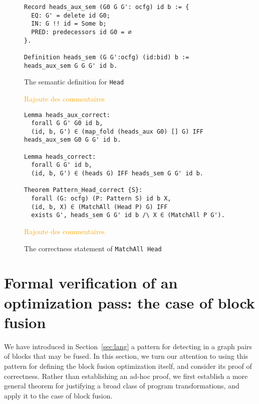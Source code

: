 \documentclass[11pt]{article}
\newcommand{\inlinecoq}[1]{\mbox{\lstinline[style=customcoq,columns=fixed,basewidth=.48em]{#1}}}
\newcommand{\ilc}[1]{\inlinecoq{#1}}
\newcommand{\gr}[1]{\textcolor{Orange}{#1}}
\newcommand{\yzt}[1]{\textcolor{ForestGreen!50}{#1}}
\newcommand{\cut}[1]{\textcolor{Gray!40}{#1}}
\begin{document}
\begin{figure}[h]
  \begin{lstlisting}[style=customcoq,basicstyle=\small\ttfamily]
Record heads_aux_sem (G0 G G': ocfg) id b := {
  EQ: G' = delete id G0;
  IN: G !! id = Some b;
  PRED: predecessors id G0 = ∅
}.

Definition heads_sem (G G':ocfg) (id:bid) b := heads_aux_sem G G G' id b.
  \end{lstlisting}
  \caption{The semantic definition for \ilc{Head}}
  \gr{Rajoute des commentaires}
  \label{fig:sem_head_def}
  \vspace{1em}
  \begin{lstlisting}[style=customcoq,basicstyle=\small\ttfamily]
Lemma heads_aux_correct:
  forall G G' G0 id b,
  (id, b, G') ∈ (map_fold (heads_aux G0) [] G) IFF heads_aux_sem G0 G G' id b.

Lemma heads_correct:
  forall G G' id b,
  (id, b, G') ∈ (heads G) IFF heads_sem G G' id b.

Theorem Pattern_Head_correct {S}:
  forall (G: ocfg) (P: Pattern S) id b X,
  (id, b, X) ∈ (MatchAll (Head P) G) IFF
  exists G', heads_sem G G' id b /\ X ∈ (MatchAll P G').
  \end{lstlisting}
  \caption{The correctness statement of \ilc{MatchAll Head}}
  \gr{Rajoute des commentaires}
  \label{fig:head_cor}
\end{figure}

\section{Formal verification of an optimization pass: the case of block fusion}
\label{sec:deno}

\yzt{We have introduced in Section~\ref{sec:lang} a pattern for detecting in a graph pairs of blocks that may be fused. In this section, we turn our attention to using this pattern for defining the block fusion optimization itself, and consider its proof of correctness. Rather than establishing an ad-hoc proof, we first establish a more general theorem for justifying a broad class of program transformations, and apply it to the case of block fusion.}
\end{document}
